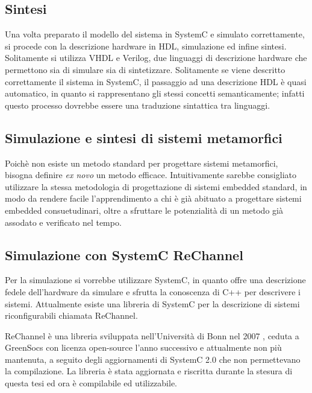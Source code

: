 \documentclass[a4paper,titlepage]{book}
\begin{document}
\subsection{Sintesi}

Una volta preparato il modello del sistema in SystemC e simulato correttamente, si procede con la descrizione hardware in HDL, simulazione ed infine sintesi. Solitamente si utilizza VHDL e Verilog, due linguaggi di descrizione hardware che permettono sia di simulare sia di sintetizzare. Solitamente se viene descritto correttamente il sistema in SystemC, il passaggio ad una descrizione HDL è quasi automatico, in quanto si rappresentano gli stessi concetti semanticamente; infatti questo processo dovrebbe essere una traduzione sintattica tra linguaggi.

\subsection{Simulazione e sintesi di sistemi metamorfici}

Poichè non esiste un metodo standard per progettare sistemi metamorfici, bisogna definire \textit{ex novo} un metodo efficace. Intuitivamente sarebbe consigliato utilizzare la stessa metodologia di progettazione di sistemi embedded standard, in modo da rendere facile l'apprendimento a chi è già abituato a progettare sistemi embedded consuetudinari, oltre a sfruttare le potenzialità di un metodo già assodato e verificato nel tempo.

\subsection{Simulazione con SystemC ReChannel}

Per la simulazione si vorrebbe utilizzare SystemC, in quanto offre una descrizione fedele dell'hardware da simulare e sfrutta la conoscenza di C++ per descrivere i sistemi. Attualmente esiste una libreria di SystemC per la descrizione di sistemi riconfigurabili chiamata ReChannel.

ReChannel è una libreria sviluppata nell'Università di Bonn nel 2007 \cite{PR2}, ceduta a GreenSocs con licenza open-source l'anno successivo e attualmente non più mantenuta, a seguito degli aggiornamenti di SystemC 2.0 che non permettevano la compilazione. La libreria è stata aggiornata e riscritta durante la stesura di questa tesi ed ora è compilabile ed utilizzabile.
\end{document}
